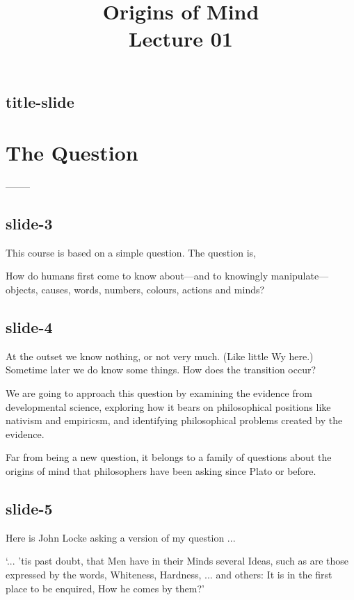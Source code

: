 \documentclass[12pt,\papersize]{extarticle}
\begin{document}
\setlength\footnotesep{1em}






\title {Origins of Mind \\ Lecture 01}



\maketitle

\subsection{title-slide}


\section{The Question}

--------
\subsection{slide-3}
This course is based on a simple question. The question is,

How do humans first come to know  about---and to knowingly manipulate---objects,
causes, words, numbers, colours, actions and minds?

\subsection{slide-4}
At the outset we know nothing, or not very much.  (Like little Wy here.)
Sometime later we do know some things.
How does the transition occur?

We are going to approach this question by examining the evidence from developmental science,
exploring how it bears on philosophical positions like nativism and empiricsm,
and identifying philosophical problems created by the evidence.

Far from being a new question, it belongs to a family of questions about the origins of mind
that philosophers have been asking since Plato or before.

\subsection{slide-5}
Here is John Locke asking a version of my question ...

‘... ’tis past doubt, that Men have in their Minds several Ideas, such as are those expressed by the words, Whiteness, Hardness, ... and others: It is in the first place to be enquired, How he comes by them?’
\citep[p.\ 104]{Locke:1975qo}
\citep[p.\ 104]{Locke:1975qo}
\end{document}
